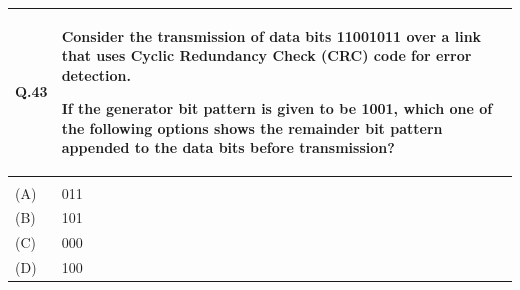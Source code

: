 \documentclass[14pt]{article}
\renewcommand{\arraystretch}{1.25}
\begin{document}
\renewcommand{\arraystretch}{1}

\vspace{0.3cm}

\renewcommand{\arraystretch}{1.25}

\begin{tabular}{|p{1.5cm}|p{12cm}|}
\hline

Q.43 &
\parbox[t]{\linewidth}{
\strut
Consider the transmission of data bits 11001011 over a link that uses
Cyclic Redundancy Check (CRC) code for error detection.

If the generator bit pattern is given to be 1001, which one of the
following options shows the remainder bit pattern appended to the data
bits before transmission?

\vspace{0.35cm}
}
\\
\hline

& \\[-0.2cm]
\hline

(A) & 011 \\[0.25cm]
\hline

(B) & 101 \\[0.25cm]
\hline

(C) & 000 \\[0.25cm]
\hline

(D) & 100 \\[0.25cm]
\hline

\end{tabular}

\renewcommand{\arraystretch}{1}

\vspace{0.3cm}
\end{document}
